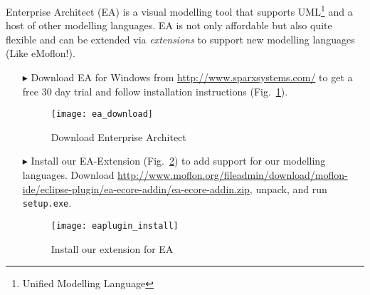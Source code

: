 \visHeader
{}
Enterprise Architect (EA) is a visual modelling tool that supports UML\footnote{Unified Modelling Language} and a host of other modelling languages.
EA is not only affordable but also quite flexible and can be extended via \emph{extensions} to support new modelling languages (Like eMoflon!).
\begin{itemize}
\item[$\blacktriangleright$] Download\hypertarget{installEA vis}{} EA for Windows from \url{http://www.sparxsystems.com/} to get a free 30 day trial and follow installation instructions (Fig.~\ref{fig_enterpriseArchitextHomepage}).

\begin{figure}[htbp]
	\centering
  	\texttt{[image: ea\_download]}
	\caption{Download Enterprise Architect}
	\label{fig_enterpriseArchitextHomepage}
\end{figure} 

\item[$\blacktriangleright$] Install our EA-Extension (Fig.~\ref{fig_eaPluginWizard}) to add support for our modelling languages.
Download \url{http://www.moflon.org/fileadmin/download/moflon-ide/eclipse-plugin/ea-ecore-addin/ea-ecore-addin.zip}, unpack, and run \texttt{setup.exe}.

\begin{figure}[htbp]
	\centering
  \texttt{[image: eaplugin\_install]}
	\caption{Install our extension for EA}
	\label{fig_eaPluginWizard}
\end{figure}
\end{itemize}